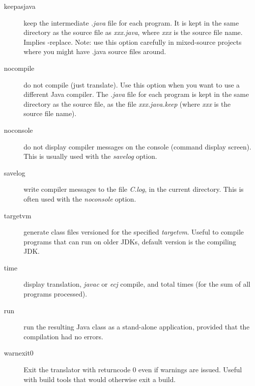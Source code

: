 \begin{description}
\item[keepasjava]
keep the intermediate \emph{.java} file for each program.  It is kept in
the same directory as the \nr{} source file as \emph{xxx.java},
where \emph{xxx} is the source file name.  Implies -replace. Note: use this option carefully in mixed-source projects where you might have .java source files around.
\item[nocompile]
do not compile (just translate).  Use this option when you want to use a
different Java compiler.  The \emph{.java} file for each program is kept
in the same directory as the \nr{} source file, as the
file \emph{xxx.java.keep} (where \emph{xxx} is the source file name).
\item[noconsole]
do not display compiler messages on the console (command display
screen).  This is usually used with the \emph{savelog} option.
\item[savelog]
write compiler messages to the file \emph{\nr{}C.log}, in the current
directory.
This is often used with the \emph{noconsole} option.
\item[targetvm]
generate class files versioned for the specified \emph{targetvm}. Useful to compile programs
that can run on older JDKs, default version is the compiling JDK.
\item[time]
display translation, \emph{javac} or \emph{ecj} compile, and total times (for the sum
of all programs processed).
\item[run]
run the resulting Java class as a stand-alone application, provided that
the compilation had no errors.
\item[warnexit0]
Exit the translator with returncode 0 even if warnings are issued. Useful with build tools that would otherwise exit a build.
\end{description}
